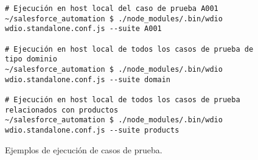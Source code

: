 \begin{figure}[H]
\footnotesize
\begin{verbatim}
# Ejecución en host local del caso de prueba A001
~/salesforce_automation $ ./node_modules/.bin/wdio wdio.standalone.conf.js --suite A001

# Ejecución en host local de todos los casos de prueba de tipo dominio
~/salesforce_automation $ ./node_modules/.bin/wdio wdio.standalone.conf.js --suite domain

# Ejecución en host local de todos los casos de prueba relacionados con productos
~/salesforce_automation $ ./node_modules/.bin/wdio wdio.standalone.conf.js --suite products
\end{verbatim}
\caption{Ejemplos de ejecución de casos de prueba.}
\label{execution}
\end{figure}

